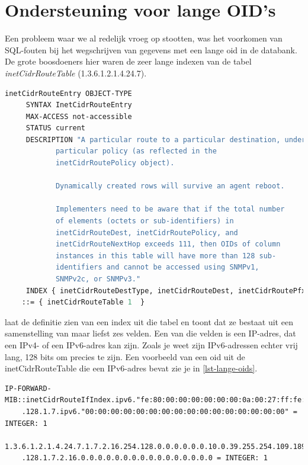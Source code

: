 \section{Ondersteuning voor lange OID's}
\label{probleem-lange-oids}

Een probleem waar we al redelijk vroeg op stootten, was het voorkomen van SQL-fouten bij het wegschrijven van gegevens met een lange \gls{oid} in de databank.
De grote boosdoeners hier waren de zeer lange indexen van de tabel \textit{inetCidrRouteTable} (1.3.6.1.2.1.4.24.7).

\begin{lstlisting}[language=asn.1, float=h, caption={Definitie van een inetCidrRouteEntry}, label=lst-inetCidrRouteEntry]
inetCidrRouteEntry OBJECT-TYPE 
	 SYNTAX InetCidrRouteEntry
	 MAX-ACCESS not-accessible
	 STATUS current
	 DESCRIPTION "A particular route to a particular destination, under a 
            particular policy (as reflected in the 
            inetCidrRoutePolicy object). 
 
            Dynamically created rows will survive an agent reboot. 
 
            Implementers need to be aware that if the total number 
            of elements (octets or sub-identifiers) in 
            inetCidrRouteDest, inetCidrRoutePolicy, and 
            inetCidrRouteNextHop exceeds 111, then OIDs of column 
            instances in this table will have more than 128 sub- 
            identifiers and cannot be accessed using SNMPv1, 
            SNMPv2c, or SNMPv3."
	 INDEX { inetCidrRouteDestType, inetCidrRouteDest, inetCidrRoutePfxLen, inetCidrRoutePolicy, inetCidrRouteNextHopType, inetCidrRouteNextHop } 
 	::= { inetCidrRouteTable 1  }
\end{lstlisting}

 laat de definitie zien van een index uit die tabel en toont dat ze bestaat uit een samenstelling van maar liefst zes velden.
Een van die velden is een IP-adres, dat een IPv4- of een IPv6-adres kan zijn.
Zoals je weet zijn IPv6-adressen echter vrij lang, 128 bits om precies te zijn.
Een voorbeeld van een \gls{oid} uit de inetCidrRouteTable die een IPv6-adres bevat zie je in \cref{lst-lange-oids}.

\begin{lstlisting}[float=h, caption={[Tekstuele en numerieke notatie van een OID uit inetCidrRouteTable]Tekstuele en numerieke notatie van een \gls{oid} uit inetCidrRouteTable}, label=lst-lange-oids]
IP-FORWARD-MIB::inetCidrRouteIfIndex.ipv6."fe:80:00:00:00:00:00:00:0a:00:27:ff:fe:6d:bd:c5"
	.128.1.7.ipv6."00:00:00:00:00:00:00:00:00:00:00:00:00:00:00:00" = INTEGER: 1

1.3.6.1.2.1.4.24.7.1.7.2.16.254.128.0.0.0.0.0.0.10.0.39.255.254.109.189.197
	.128.1.7.2.16.0.0.0.0.0.0.0.0.0.0.0.0.0.0.0.0 = INTEGER: 1
\end{lstlisting}

